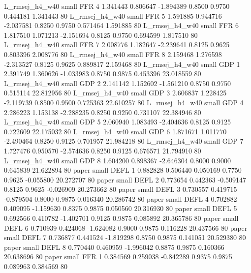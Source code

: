 L_rmsej_h4_w40      small      FFR                 4 1.341443 0.806647 -1.894389 0.8500 0.9750  0.444181    1.341443 80
L_rmsej_h4_w40      small      FFR                 5 1.591885 0.944716 -2.037581 0.8250 0.9750  0.571464    1.591885 80
L_rmsej_h4_w40      small      FFR                 6 1.817510 1.071213 -2.151694 0.8125 0.9750  0.694599    1.817510 80
L_rmsej_h4_w40      small      FFR                 7 2.008776 1.182647 -2.239641 0.8125 0.9625  0.803396    2.008776 80
L_rmsej_h4_w40      small      FFR                 8 2.159468 1.276598 -2.313527 0.8125 0.9625  0.889817    2.159468 80
L_rmsej_h4_w40      small      GDP                 1 2.391749 1.360626 -1.033983 0.8750 0.9875  0.453396   23.018559 80
L_rmsej_h4_w40      small      GDP                 2 2.141142 1.152602 -1.561210 0.8750 0.9750  0.515114   22.812956 80
L_rmsej_h4_w40      small      GDP                 3 2.606837 1.228425 -2.119739 0.8500 0.9500  0.725363   22.610257 80
L_rmsej_h4_w40      small      GDP                 4 2.286223 1.153138 -2.288235 0.8250 0.9250  0.731107   22.384946 80
L_rmsej_h4_w40      small      GDP                 5 2.060940 1.083493 -2.404636 0.8125 0.9125  0.722609   22.175032 80
L_rmsej_h4_w40      small      GDP                 6 1.871671 1.011770 -2.490464 0.8250 0.9125  0.701957   21.984218 80
L_rmsej_h4_w40      small      GDP                 7 1.727476 0.950570 -2.574636 0.8250 0.9125  0.676571   21.794910 80
L_rmsej_h4_w40      small      GDP                 8 1.604200 0.898367 -2.646304 0.8000 0.9000  0.645839   21.622894 80
         paper      small     DEFL                 1 0.882828 0.506440  0.050169 0.7750 0.9625 -0.055800   20.272707 80
         paper      small     DEFL                 2 0.773654 0.442363 -0.509147 0.8125 0.9625 -0.026909   20.273662 80
         paper      small     DEFL                 3 0.730557 0.419715 -0.879504 0.8000 0.9875  0.016340   20.286742 80
         paper      small     DEFL                 4 0.702882 0.409095 -1.159630 0.8375 0.9875  0.050560   20.316930 80
         paper      small     DEFL                 5 0.692566 0.410782 -1.402701 0.9125 0.9875  0.085892   20.365786 80
         paper      small     DEFL                 6 0.710939 0.424068 -1.624082 0.9000 0.9875  0.116228   20.437566 80
         paper      small     DEFL                 7 0.736877 0.441524 -1.819298 0.8750 0.9875  0.141051   20.529380 80
         paper      small     DEFL                 8 0.770440 0.460959 -1.996042 0.8875 0.9875  0.160366   20.638696 80
         paper      small      FFR                 1 0.384569 0.259038 -0.842289 0.9375 0.9875  0.089963    0.384569 80
